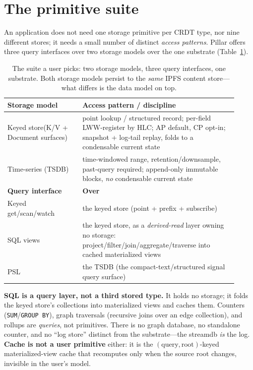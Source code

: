 \documentclass[10pt,twocolumn]{article}
\newcommand{\code}[1]{\texttt{\small #1}}
\begin{document}
\section{The primitive suite}
An application does not need one storage primitive per CRDT type, nor nine different
stores; it needs a small number of distinct \emph{access patterns}. Pillar offers
three query interfaces over two storage models over the one substrate
(Table~\ref{tab:suite}).

\begin{table}[t]
\centering\small
\begin{tabular}{@{}p{0.30\linewidth}p{0.62\linewidth}@{}}
\toprule
\textbf{Storage model} & \textbf{Access pattern / discipline}\\
\midrule
Keyed store\newline(K/V + Document surfaces) & point lookup / structured record;
per-field LWW-register by HLC; AP default, CP opt-in; snapshot + log-tail replay,
folds to a condensable current state\\
Time-series (TSDB) & time-windowed range, retention/downsample, past-query required;
append-only immutable blocks, \emph{no} condensable current state\\
\midrule
\textbf{Query interface} & \textbf{Over}\\
\midrule
Keyed get/scan/watch & the keyed store (point + prefix + subscribe)\\
SQL views & the keyed store, as a \emph{derived-read} layer owning no storage:
project/filter/join/aggregate/traverse into cached materialized views\\
PSL & the TSDB (the compact-text/structured signal query surface)\\
\bottomrule
\end{tabular}
\caption{The suite a user picks: two storage models, three query interfaces, one
substrate. Both storage models persist to the \emph{same} IPFS content store---what
differs is the data model on top.}
\label{tab:suite}
\end{table}

\textbf{SQL is a query layer, not a third stored type.} It holds no storage; it folds
the keyed store's collections into materialized views and caches them. Counters
(\code{SUM}/\code{GROUP BY}), graph traversals (recursive joins over an edge
collection), and rollups are \emph{queries}, not primitives. There is no graph
database, no standalone counter, and no ``log store'' distinct from the substrate---the
streamdb \emph{is} the log. \textbf{Cache is not a user primitive} either: it is the
$(\text{query},\text{root})$-keyed materialized-view cache that recomputes only when
the source root changes, invisible in the user's model.
\end{document}
